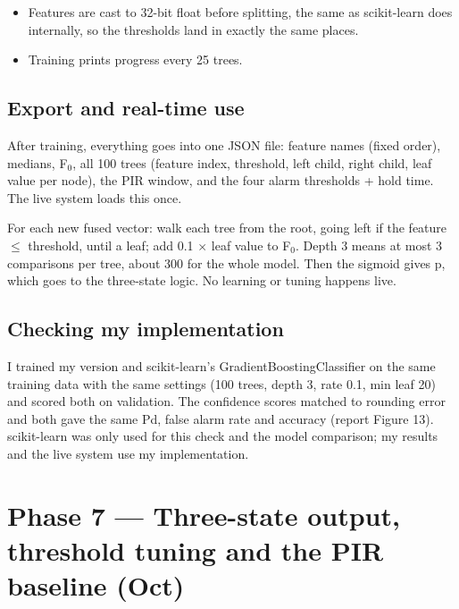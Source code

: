 \documentclass[11pt,a4paper]{article}
\providecommand{\tightlist}{\setlength{\itemsep}{0pt}\setlength{\parskip}{0pt}}
\begin{document}
\begin{itemize}
\tightlist
\item
  Features are cast to 32-bit
  float before splitting, the
  same as scikit-learn does
  internally, so the
  thresholds land in exactly
  the same places.
\item
  Training prints progress
  every 25 trees.
\end{itemize}

\hypertarget{export-and-real-time-use}{%
\subsection{Export and
real-time
use}\label{export-and-real-time-use}}

After training, everything
goes into one JSON file:
feature names (fixed order),
medians, F$_0$, all 100 trees
(feature index, threshold,
left child, right child, leaf
value per node), the PIR
window, and the four alarm
thresholds + hold time. The
live system loads this once.

For each new fused vector:
walk each tree from the root,
going left if the feature $\leq$
threshold, until a leaf; add
0.1 $\times$ leaf value to F$_0$. Depth
3 means at most 3 comparisons
per tree, about 300 for the
whole model. Then the sigmoid
gives p, which goes to the
three-state logic. No learning
or tuning happens live.

\hypertarget{checking-my-implementation}{%
\subsection{Checking my
implementation}\label{checking-my-implementation}}

I trained my version and
scikit-learn's
GradientBoostingClassifier on
the same training data with
the same settings (100 trees,
depth 3, rate 0.1, min leaf
20) and scored both on
validation. The confidence
scores matched to rounding
error and both gave the same
Pd, false alarm rate and
accuracy (report Figure 13).
scikit-learn was only used for
this check and the model
comparison; my results and the
live system use my
implementation.

\hypertarget{phase-7-three-state-output-threshold-tuning-and-the-pir-baseline-oct}{%
\section{Phase 7 ---
Three-state output, threshold
tuning and the PIR baseline
(Oct)}\label{phase-7-three-state-output-threshold-tuning-and-the-pir-baseline-oct}}
\end{document}
